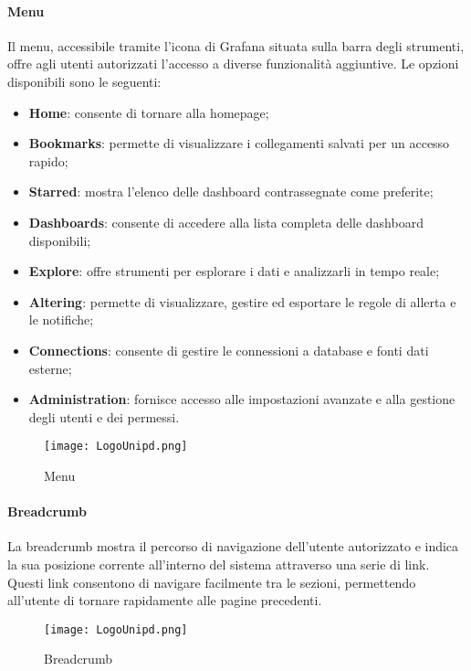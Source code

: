 \documentclass[10pt]{article}
\begin{document}
\begin{justify}
    \paragraph{Menu}
    Il menu, accessibile tramite l'icona di Grafana situata sulla barra degli strumenti, offre agli utenti autorizzati l'accesso a diverse funzionalità aggiuntive. Le opzioni disponibili sono le seguenti:
    \begin{itemize}
        \item \textbf{Home}: consente di tornare alla homepage;
        \item \textbf{Bookmarks}: permette di visualizzare i collegamenti salvati per un accesso rapido;
        \item \textbf{Starred}: mostra l'elenco delle dashboard contrassegnate come preferite;
        \item \textbf{Dashboards}: consente di accedere alla lista completa delle dashboard disponibili;
        \item \textbf{Explore}: offre strumenti per esplorare i dati e analizzarli in tempo reale;
        \item \textbf{Altering}: permette di visualizzare, gestire ed esportare le regole di allerta e le notifiche;
        \item \textbf{Connections}: consente di gestire le connessioni a database e fonti dati esterne;
        \item \textbf{Administration}: fornisce accesso alle impostazioni avanzate e alla gestione degli utenti e dei permessi.
    \end{itemize}
    \begin{figure}[H]
    \centering
    \texttt{[image: LogoUnipd.png]}
    \caption{Menu}
    \end{figure}

    \paragraph{Breadcrumb}
    La breadcrumb mostra il percorso di navigazione dell'utente autorizzato e indica la sua posizione corrente all'interno del sistema attraverso una serie di link. Questi link consentono di navigare facilmente tra le sezioni, permettendo all'utente di tornare rapidamente alle pagine precedenti.
    \begin{figure}[H]
    \centering
    \texttt{[image: LogoUnipd.png]}
    \caption{Breadcrumb}
    \end{figure}


\end{justify}
\end{document}
